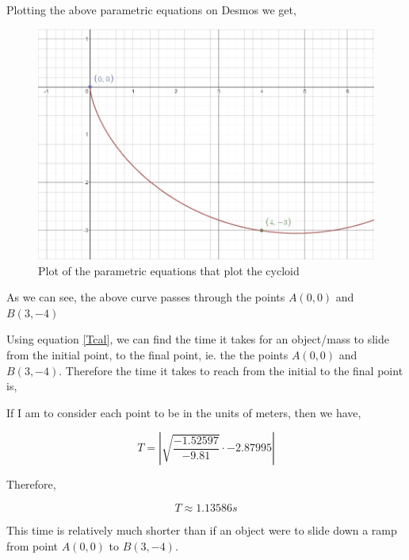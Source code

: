 {Plotting the above parametric equations on Desmos we get,}

\begin{figure}[H]
\centering
\includegraphics[width=15cm]{cycplt.jpg}
    		\caption{{Plot of the parametric equations that plot the cycloid}}
\end{figure}

{As we can see, the above curve passes through the points $A(0,0)$ and $B(3,-4)$}

{Using equation \ref{Tcal}, we can find the time it takes for an object/mass to slide from the initial point, to the final point, ie. the the points $A(0,0)$ and $B(3,-4)$. Therefore the time it takes to reach from the initial to the final point is,}

{If I am to consider each point to be in the units of meters, then we have,}

	$$T = \left|\sqrt{\frac{-1.52597}{-9.81}}\cdot -2.87995\right|$$

{Therefore,}

	$$T \approx 1.13586 s$$

{This time is relatively much shorter than if an object were to slide down a ramp from point $A(0,0)$ to $B(3,-4)$.}


